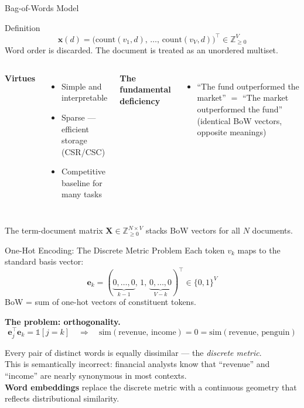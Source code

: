 \documentclass[9pt,t]{beamer}
\begin{document}
\begin{frame}{Bag-of-Words Model}
  \begin{block}{Definition}
    \[
      \mathbf{x}(d) = \bigl(\mathrm{count}(v_1, d),\, \ldots,\, \mathrm{count}(v_V, d)\bigr)^\top
      \in \mathbb{Z}_{\geq 0}^V
    \]
    Word order is discarded. The document is treated as an unordered multiset.
  \end{block}
  \medskip
  \begin{columns}
    \textbf{Virtues}
    \begin{itemize}
      \item Simple and interpretable
      \item Sparse --- efficient storage (CSR/CSC)
      \item Competitive baseline for many tasks
    \end{itemize}
    \textbf{The fundamental deficiency}
    \begin{itemize}
      \item ``The fund outperformed the market'' $=$
            ``The market outperformed the fund'' \quad (identical BoW vectors, opposite meanings)
    \end{itemize}
  \end{columns}
  \medskip
  The term-document matrix $\mathbf{X} \in \mathbb{Z}_{\geq 0}^{N \times V}$
  stacks BoW vectors for all $N$ documents.
\end{frame}

\begin{frame}{One-Hot Encoding: The Discrete Metric Problem}
  Each token $v_k$ maps to the standard basis vector:
  \[
    \mathbf{e}_k = (\underbrace{0,\ldots,0}_{k-1},\, 1,\, \underbrace{0,\ldots,0}_{V-k})^\top
    \in \{0,1\}^V
  \]
  BoW = sum of one-hot vectors of constituent tokens.
  \medskip
  \begin{underhood}
    \textbf{The problem: orthogonality.}
    \[
      \mathbf{e}_j^\top \mathbf{e}_k = \mathbb{1}[j=k]
      \quad \Rightarrow \quad
      \mathrm{sim}(\text{revenue},\, \text{income}) = 0
      = \mathrm{sim}(\text{revenue},\, \text{penguin})
    \]
  \end{underhood}
  \medskip
  Every pair of distinct words is equally dissimilar --- the \emph{discrete metric}.\\
  This is semantically incorrect: financial analysts know that ``revenue'' and ``income''
  are nearly synonymous in most contexts.\\
  \medskip
  \textbf{Word embeddings} replace the discrete metric with a continuous geometry
  that reflects distributional similarity.
\end{frame}
\end{document}
